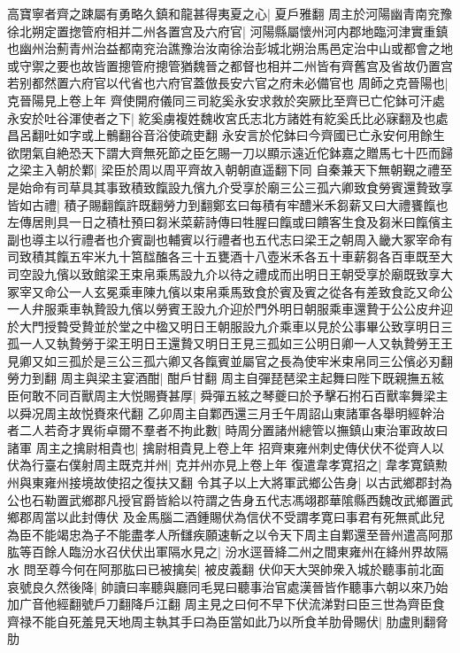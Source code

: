 高寶寧者齊之踈屬有勇略久鎮和龍甚得夷夏之心|{
	夏戶雅翻}
周主於河陽幽青南兖豫徐北朔定置揔管府相并二州各置宫及六府官|{
	河陽縣屬懷州河内郡地臨河津實重鎮也幽州治薊青州治益都南兖治譙豫治汝南徐治彭城北朔治馬邑定治中山或都會之地或守禦之要也故皆置摠管府摠管猶魏晉之都督也相并二州皆有齊舊宫及省故仍置宫若别都然置六府官以代省也六府官蓋倣長安六官之府未必備官也}
周師之克晉陽也|{
	克晉陽見上卷上年}
齊使開府儀同三司紇奚永安求救於突厥比至齊已亡佗鉢可汗處永安於吐谷渾使者之下|{
	紇奚虜複姓魏收宮氏志北方諸姓有紇奚氏比必寐翻及也處昌呂翻吐如字或上鶻翻谷音浴使疏吏翻}
永安言於佗鉢曰今齊國已亡永安何用餘生欲閉氣自絶恐天下謂大齊無死節之臣乞賜一刀以顯示遠近佗鉢嘉之贈馬七十匹而歸之梁主入朝於鄴|{
	梁臣於周以周平齊故入朝朝直遥翻下同}
自秦兼天下無朝覲之禮至是始命有司草具其事致積致餼設九儐九介受享於廟三公三孤六卿致食勞賓還贄致享皆如古禮|{
	積子賜翻餼許既翻勞力到翻鄭玄曰每積有牢醴米禾芻薪又曰大禮饔餼也左傳居則具一日之積杜預曰芻米菜薪詩傳曰牲腥曰餼或曰饋客生食及芻米曰餼儐主副也導主以行禮者也介賓副也輔賓以行禮者也五代志曰梁王之朝周入畿大冢宰命有司致積其餼五牢米九十筥䤈醢各三十五甕酒十八壺米禾各五十車薪芻各百車既至大司空設九儐以致館梁王束帛乘馬設九介以待之禮成而出明日王朝受享於廟既致享大冢宰又命公一人玄冕乘車陳九儐以束帛乘馬致食於賓及賓之從各有差致食訖又命公一人弁服乘車執贄設九儐以勞賓王設九介迎於門外明日朝服乘車還贄于公公皮弁迎於大門授䞇受贄並於堂之中楹又明日王朝服設九介乘車以見於公事畢公致享明日三孤一人又執贄勞于梁王明日王還贄又明日王見三孤如三公明日卿一人又執贄勞王王見卿又如三孤於是三公三孤六卿又各餼賓並屬官之長為使牢米束帛同三公儐必刃翻勞力到翻}
周主與梁主宴酒酣|{
	酣戶甘翻}
周主自彈琵琶梁主起舞曰陛下既親撫五絃臣何敢不同百獸周主大悦賜賚甚厚|{
	舜彈五絃之琴夔曰於予擊石拊石百獸率舞梁主以舜况周主故悦賚來代翻}
乙卯周主自鄴西還三月壬午周詔山東諸軍各舉明經幹治者二人若奇才異術卓爾不羣者不拘此數|{
	時周分置諸州總管以撫鎮山東治軍政故曰諸軍}
周主之擒尉相貴也|{
	擒尉相貴見上卷上年}
招齊東雍州刺史傳伏伏不從齊人以伏為行臺右僕射周主既克并州|{
	克并州亦見上卷上年}
復遣韋孝寛招之|{
	韋孝寛鎮勲州與東雍州接境故使招之復扶又翻}
令其子以上大將軍武鄉公告身|{
	以古武鄉郡封為公也石勒置武鄉郡凡授官爵皆給以符謂之告身五代志馮翊郡華隂縣西魏改武鄉置武鄉郡周當以此封傳伏}
及金馬腦二酒鍾賜伏為信伏不受謂孝寛曰事君有死無貳此兒為臣不能竭忠為子不能盡孝人所讎疾願速斬之以令天下周主自鄴還至晉州遣高阿那肱等百餘人臨汾水召伏伏出軍隔水見之|{
	汾水逕晉絳二州之間東雍州在絳州界故隔水}
問至尊今何在阿那肱曰已被擒矣|{
	被皮義翻}
伏仰天大哭帥衆入城於聽事前北面哀號良久然後降|{
	帥讀曰率聽與廳同毛晃曰聽事治官處漢晉皆作聽事六朝以來乃始加广音他經翻號戶刀翻降戶江翻}
周主見之曰何不早下伏流涕對曰臣三世為齊臣食齊禄不能自死羞見天地周主執其手曰為臣當如此乃以所食羊肋骨賜伏|{
	肋盧則翻脅肋}
